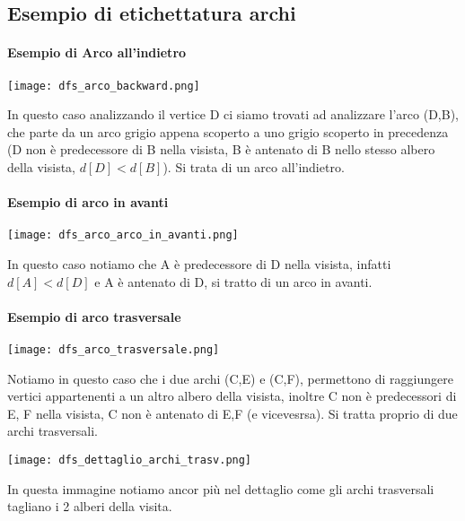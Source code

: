 \subsection{Esempio di etichettatura archi}
\paragraph*{Esempio di Arco all'indietro}
\begin{center}
    \texttt{[image: dfs\_arco\_backward.png]}
\end{center}
In questo caso analizzando il vertice D ci siamo trovati ad analizzare l'arco (D,B),
che parte da un arco grigio appena scoperto a uno grigio scoperto in precedenza (D non
è predecessore di B nella visista, B è antenato di B nello stesso albero della visista,
$d[D] < d[B]$). Si trata di un arco all'indietro.
\paragraph*{Esempio di arco in avanti}
\begin{center}
    \texttt{[image: dfs\_arco\_arco\_in\_avanti.png]}
\end{center}
In questo caso notiamo che A è predecessore di D nella visista, infatti $d[A] < d[D]$ e
A è antenato di D, si tratto di un arco in avanti.\\
\paragraph*{Esempio di arco trasversale}
\begin{center}
    \texttt{[image: dfs\_arco\_trasversale.png]}
\end{center}
Notiamo in questo caso che i due archi (C,E) e (C,F), permettono di raggiungere vertici
appartenenti a un altro albero della visista, inoltre C non è predecessori di E, F nella
visista, C non è antenato di E,F (e vicevesrsa). Si tratta proprio di due archi trasversali.
\begin{center}
    \texttt{[image: dfs\_dettaglio\_archi\_trasv.png]}
\end{center}
In questa immagine notiamo ancor più nel dettaglio come gli archi trasversali tagliano i
2 alberi della visita.
